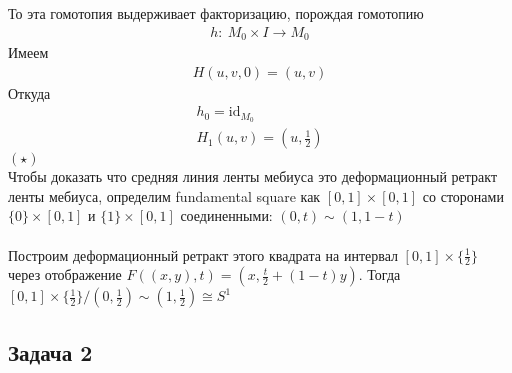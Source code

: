 			То эта гомотопия выдерживает факторизацию, порождая гомотопию
			\begin{gather*}
				h:\ M_0 \times I \to M_0
			\end{gather*}
			Имеем
			\begin{gather*}
				H(u,v,0) = (u,v)
			\end{gather*}
			Откуда
			\begin{gather*}
				h_0 = \text{id}_{M_0}\\
				H_1(u,v) = (u, \frac{1}{2})
			\end{gather*}
			$(\star)$\\
			Чтобы доказать что средняя линия ленты мебиуса это деформационный ретракт ленты мебиуса, определим fundamental square как $[0,1] \times[0,1]$ со сторонами $\{0\} \times[0,1]$ и $\{1\} \times[0,1]$ соединенными: $(0, t) \sim(1,1-t)$\\
			\\
			Построим деформационный ретракт этого квадрата на интервал $[0,1] \times\{\frac{1}{2}\}$ через отображение $F((x, y), t)=(x, \frac{t}{2}+(1-t) y)$. Тогда $[0,1] \times\{\frac{1}{2}\} /(0,\frac{1}{2}) \sim(1,\frac{1}{2}) \cong S^{1}$\\
			
		\subsection*{Задача 2}
